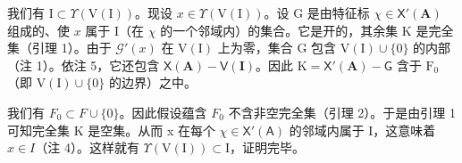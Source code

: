 我们有 \(\mathrm{I} \subset \Upsilon(\mathrm{V}(\mathrm{I}))\)。现设 \(x \in \Upsilon(\mathrm{V}(\mathrm{I}))\)。设 \(\mathrm{G}\) 是由特征标 \(\chi \in \mathsf{X}'(\mathbf{A})\) 组成的、使 \(x\) 属于 \(\mathrm{I}\)（在 \(\chi\) 的一个邻域内）的集合。它是开的，其余集 \(\mathrm{K}\) 是完全集（引理 1）。由于 \(\mathcal{G}'(x)\) 在 \(\mathrm{V}(\mathrm{I})\) 上为零，集合 \(\mathrm{G}\) 包含 \(\mathrm{V}(\mathrm{I}) \cup \{0\}\) 的内部（注 1）。依注 5，它还包含 \(\mathsf{X}(\mathbf{A}) - \mathsf{V}(\mathbf{I})\)。因此 \(\mathrm{K} = \mathsf{X}'(\mathbf{A}) - \mathsf{G}\) 含于 \(\mathrm{F}_0\)（即 \(\mathrm{V}(\mathrm{I}) \cup \{0\}\) 的边界）之中。

我们有 \(F_{0} \subset F \cup \{0\}\)。因此假设蕴含 \(F_{0}\) 不含非空完全集（引理 2）。于是由引理 1 可知完全集 K 是空集。从而 x 在每个 \(\chi \in \mathsf{X}'(\mathsf{A})\) 的邻域内属于 I，这意味着 \(x \in I\)（注 4）。这样就有 \(\Upsilon(\mathrm{V}(\mathrm{I})) \subset \mathrm{I}\)，证明完毕。

